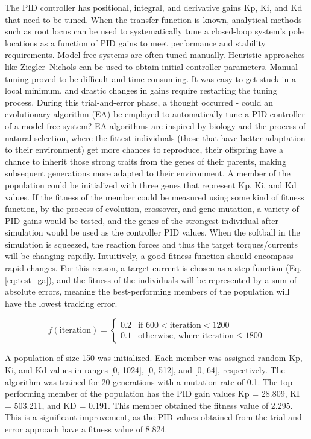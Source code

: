 \bigskip \noindent
The PID controller has positional, integral, and derivative gains Kp, Ki, and Kd that need to be tuned. When the transfer function is known, analytical methods such as root locus can be used to systematically tune a closed-loop system's pole locations as a function of PID gains to meet performance and stability requirements. Model-free systems are often tuned manually. Heuristic approaches like Ziegler–Nichols can be used to obtain initial controller parameters. Manual tuning proved to be difficult and time-consuming. It was easy to get stuck in a local minimum, and drastic changes in gains require restarting the tuning process. During this trial-and-error phase, a thought occurred - could an evolutionary algorithm (EA) be employed to automatically tune a PID controller of a model-free system? EA algorithms are inspired by biology and the process of natural selection, where the fittest individuals (those that have better adaptation to their environment) get more chances to reproduce, their offspring have a chance to inherit those strong traits from the genes of their parents, making subsequent generations more adapted to their environment. A member of the population could be initialized with three genes that represent Kp, Ki, and Kd values. If the fitness of the member could be measured using some kind of fitness function, by the process of evolution, crossover, and gene mutation, a variety of PID gains would be tested, and the genes of the strongest individual after simulation would be used as the controller PID values. When the softball in the simulation is squeezed, the reaction forces and thus the target torques/currents will be changing rapidly. Intuitively, a good fitness function should encompass rapid changes. For this reason, a target current is chosen as a step function (Eq. \ref{eq:test_ga}), and the fitness of the individuals will be represented by a sum of absolute errors, meaning the best-performing members of the population will have the lowest tracking error.

\begin{equation}
f(\text{iteration}) =
\begin{cases}
0.2 & \text{if } 600 < \text{iteration} < 1200 \\
0.1 & \text{otherwise, where iteration} \leq 1800
\end{cases}
\label{eq:test_ga}
\end{equation}

\bigskip \noindent
A population of size 150 was initialized. Each member was assigned random Kp, Ki, and Kd values in ranges [0, 1024], [0, 512], and [0, 64], respectively. The algorithm was trained for 20 generations with a mutation rate of 0.1. The top-performing member of the population has the PID gain values Kp = 28.809, KI = 503.211, and KD = 0.191. This member obtained the fitness value of 2.295. This is a significant improvement, as the PID values obtained from the trial-and-error approach have a fitness value of 8.824. 

